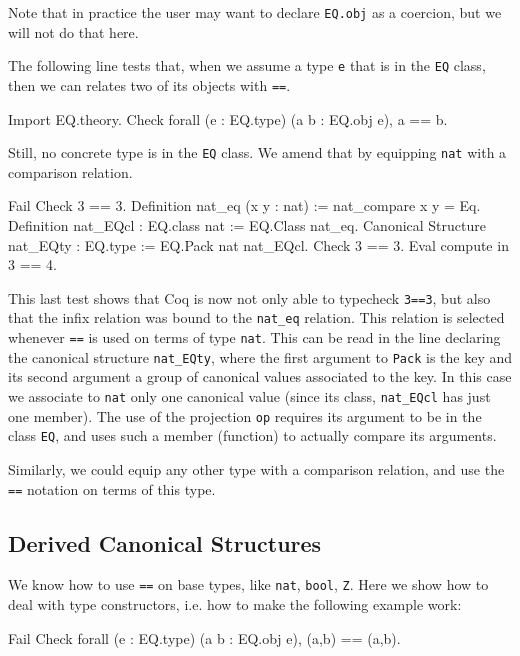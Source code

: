 Note that in practice the user may want to declare \texttt{EQ.obj} as a coercion,
but we will not do that here.

The following line tests that, when we assume a type \texttt{e} that is in the
\texttt{EQ} class, then we can relates two of its objects with \texttt{==}.

\begin{coq_example}
Import EQ.theory.
Check forall (e : EQ.type) (a b : EQ.obj e), a == b.
\end{coq_example}

Still, no concrete type is in the \texttt{EQ} class.  We amend that by equipping \texttt{nat}
with a comparison relation.

\begin{coq_example}
Fail Check 3 == 3.
Definition nat_eq (x y : nat) := nat_compare x y = Eq.
Definition nat_EQcl : EQ.class nat := EQ.Class nat_eq.
Canonical Structure nat_EQty : EQ.type := EQ.Pack nat nat_EQcl.
Check 3 == 3.
Eval compute in 3 == 4.
\end{coq_example}

This last test shows that Coq is now not only able to typecheck \texttt{3==3}, but
also that the infix relation was bound to the \texttt{nat\_eq} relation.  This
relation is selected whenever \texttt{==} is used on terms of type \texttt{nat}.  This
can be read in the line declaring the canonical structure \texttt{nat\_EQty},
where the first argument to \texttt{Pack} is the key and its second argument
a group of canonical values associated to the key.  In this case we associate
to \texttt{nat} only one canonical value (since its class, \texttt{nat\_EQcl} has just one
member).  The use of the projection \texttt{op} requires its argument to be in
the class \texttt{EQ}, and uses such a member (function) to actually compare
its arguments.

Similarly, we could equip any other type with a comparison relation, and
use the \texttt{==} notation on terms of this type.

\subsection{Derived Canonical Structures}

We know how to use \texttt{==} on base types, like \texttt{nat}, \texttt{bool}, \texttt{Z}.
Here we show how to deal with type constructors, i.e. how to make the
following example work:

\begin{coq_example}
Fail Check forall (e : EQ.type) (a b : EQ.obj e), (a,b) == (a,b). 
\end{coq_example}


